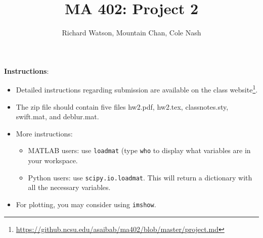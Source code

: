 \documentclass[10pt]{exam}
\title{MA 402: Project 2}
\author{Richard Watson, Mountain Chan, Cole Nash}
\begin{document}
\maketitle
\textbf{Instructions}: 

\begin{itemize}
\item Detailed instructions regarding submission are available on the class website\footnote{\url{https://github.ncsu.edu/asaibab/ma402/blob/master/project.md}}.
\item The zip file should contain five files hw2.pdf, hw2.tex, classnotes.sty, swift.mat, and deblur.mat. 

\item More instructions:
\begin{itemize}
\item MATLAB users: use \verb|loadmat| (type \verb|who| to display what variables are in your workspace. 
\item Python users: use \verb|scipy.io.loadmat|. This will return a dictionary with all the necessary variables.
\end{itemize}
\item For plotting, you may consider using \verb|imshow|.
\end{itemize}

\vspace{2mm}
\end{document}
